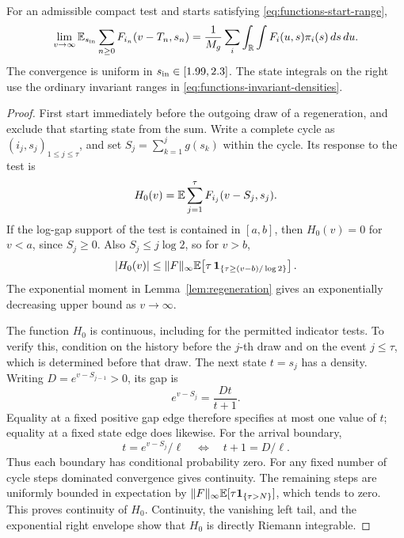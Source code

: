 \begin{proposition}\label{prop:occupation}
For an admissible compact test and starts satisfying
\eqref{eq:functions-start-range},
\begin{equation}\label{eq:functions-occupation-limit}
 \lim_{v\to\infty}
 \mathbb E_{s_{\rm in}}\sum_{n\ge0}F_{i_n}(v-T_n,s_n)
 =
 \frac1{M_g}\sum_i\int_{\mathbb R}\int F_i(u,s)\pi_i(s)\,ds\,du.
\end{equation}
The convergence is uniform in \(s_{\rm in}\in[1.99,2.3]\).
The state integrals on the right use the ordinary invariant ranges
in \eqref{eq:functions-invariant-densities}.
\end{proposition}

\begin{proof}
First start immediately before the outgoing draw of a regeneration,
and exclude that starting state from the sum.
Write a complete cycle as
\((i_j,s_j)_{1\le j\le\tau}\), and set
\(S_j=\sum_{k=1}^j g(s_k)\) within the cycle.
Its response to the test is
\begin{equation}\label{eq:functions-cycle-test}
 H_0(v)=\mathbb E\sum_{j=1}^{\tau}F_{i_j}(v-S_j,s_j).
\end{equation}
If the log-gap support of the test is contained in \([a,b]\),
then \(H_0(v)=0\) for \(v<a\), since \(S_j\ge0\).
Also \(S_j\le j\log2\), so for \(v>b\),
\[
 |H_0(v)|\le
 \|F\|_\infty
 \mathbb E\!\left[\tau\,
 \mathbf 1_{\{\tau\ge(v-b)/\log2\}}\right].
\]
The exponential moment in Lemma~\ref{lem:regeneration} gives an
exponentially decreasing upper bound as \(v\to\infty\).

The function \(H_0\) is continuous, including for the permitted
indicator tests.  To verify this, condition on the history before
the \(j\)-th draw and on the event \(j\le\tau\), which is determined
before that draw.  The next state \(t=s_j\) has a density.
Writing \(D=e^{v-S_{j-1}}>0\), its gap is
\[
 e^{v-S_j}=\frac{Dt}{t+1}.
\]
Equality at a fixed positive gap edge therefore specifies at most
one value of \(t\); equality at a fixed state edge does likewise.
For the arrival boundary,
\[
 t=e^{v-S_j}/\ell
 \quad\Longleftrightarrow\quad
 t+1=D/\ell.
\]
Thus each boundary has conditional probability zero.
For any fixed number of cycle steps dominated convergence gives
continuity.  The remaining steps are uniformly bounded in expectation
by \(\|F\|_\infty\mathbb E[\tau\mathbf 1_{\{\tau>N\}}]\), which tends to zero.
This proves continuity of \(H_0\).
Continuity, the vanishing left tail, and the exponential right
envelope show that \(H_0\) is directly Riemann integrable.


\end{proof}
